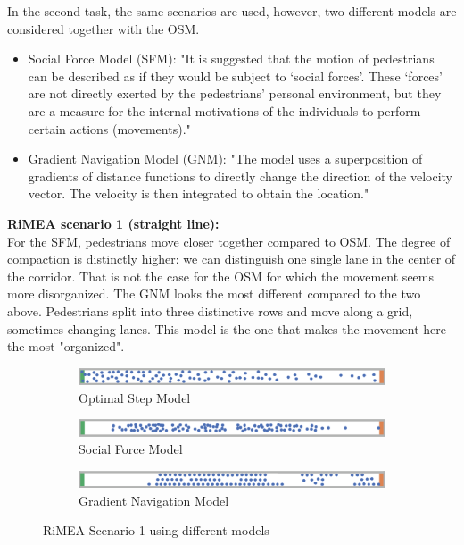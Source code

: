 In the second task, the same scenarios are used, however, two different models are considered together with the OSM. 
\begin{itemize}
    \item Social Force Model (SFM): 
"It is suggested that the motion of pedestrians can be described as if they would be subject to `social forces'. These `forces' are not directly exerted by the pedestrians' personal environment, but they are a measure for the internal motivations of the individuals to perform certain actions (movements)." \cite{Helbing_1995}\\ 
    \item Gradient Navigation Model (GNM): 
"The model uses a superposition of gradients of distance functions to directly change the direction of the velocity vector. The velocity is then integrated to obtain the location." \cite{Dietrich_2014}
\end{itemize}

\textbf{RiMEA scenario 1 (straight line):}\\
For the SFM, pedestrians move closer together compared to OSM. The degree of compaction is distinctly higher: we can distinguish one single lane in the center of the corridor. That  is not the case for the OSM for which the movement seems more disorganized. 
The GNM looks the most different compared to the two above. Pedestrians split into three distinctive rows and move along a grid, sometimes changing lanes. This model is the one that makes the movement here the most "organized". 

\begin{figure}[H]
 \centering
 \begin{subfigure}[b]{0.6\textwidth}
     \centering
     \includegraphics[width=\textwidth]{images/2-osm-rimea1.png}
    \caption{Optimal Step Model}
    \label{fig: rimea1-osm}
 \end{subfigure}
 \begin{subfigure}[b]{0.6\textwidth}
      \centering
     \includegraphics[width=\textwidth]{images/2-sfm-rimea1.png}
     \caption{Social Force Model}
     \label{fig: rimea1-sfm}
 \end{subfigure}
 \begin{subfigure}[b]{0.6\textwidth}
      \centering
     \includegraphics[width=\textwidth]{images/2-gnm-rimea1.png}
     \caption{Gradient Navigation Model}
     \label{fig: rimea1-gnm}
 \end{subfigure}
 \caption{RiMEA Scenario 1 using different models}
 \label{fig: rimea1}
\end{figure}

